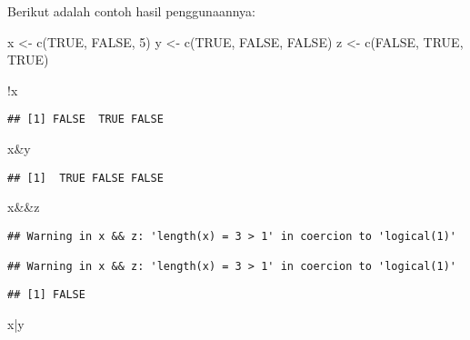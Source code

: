 \documentclass[
]{book}
\newenvironment{Shaded}{\begin{snugshade}}{\end{snugshade}}
\newcommand{\ConstantTok}[1]{\textcolor[rgb]{0.00,0.00,0.00}{#1}}
\newcommand{\DecValTok}[1]{\textcolor[rgb]{0.00,0.00,0.81}{#1}}
\newcommand{\FunctionTok}[1]{\textcolor[rgb]{0.00,0.00,0.00}{#1}}
\newcommand{\NormalTok}[1]{#1}
\newcommand{\OtherTok}[1]{\textcolor[rgb]{0.56,0.35,0.01}{#1}}
\newcommand{\SpecialCharTok}[1]{\textcolor[rgb]{0.00,0.00,0.00}{#1}}
\begin{document}
Berikut adalah contoh hasil penggunaannya:

\begin{Shaded}
\begin{Highlighting}[]
\NormalTok{x }\OtherTok{\textless{}{-}} \FunctionTok{c}\NormalTok{(}\ConstantTok{TRUE}\NormalTok{, }\ConstantTok{FALSE}\NormalTok{, }\DecValTok{5}\NormalTok{)}
\NormalTok{y }\OtherTok{\textless{}{-}} \FunctionTok{c}\NormalTok{(}\ConstantTok{TRUE}\NormalTok{, }\ConstantTok{FALSE}\NormalTok{, }\ConstantTok{FALSE}\NormalTok{)}
\NormalTok{z }\OtherTok{\textless{}{-}} \FunctionTok{c}\NormalTok{(}\ConstantTok{FALSE}\NormalTok{, }\ConstantTok{TRUE}\NormalTok{, }\ConstantTok{TRUE}\NormalTok{)}

\SpecialCharTok{!}\NormalTok{x}
\end{Highlighting}
\end{Shaded}

\begin{verbatim}
## [1] FALSE  TRUE FALSE
\end{verbatim}

\begin{Shaded}
\begin{Highlighting}[]
\NormalTok{x}\SpecialCharTok{\&}\NormalTok{y}
\end{Highlighting}
\end{Shaded}

\begin{verbatim}
## [1]  TRUE FALSE FALSE
\end{verbatim}

\begin{Shaded}
\begin{Highlighting}[]
\NormalTok{x}\SpecialCharTok{\&\&}\NormalTok{z}
\end{Highlighting}
\end{Shaded}

\begin{verbatim}
## Warning in x && z: 'length(x) = 3 > 1' in coercion to 'logical(1)'

## Warning in x && z: 'length(x) = 3 > 1' in coercion to 'logical(1)'
\end{verbatim}

\begin{verbatim}
## [1] FALSE
\end{verbatim}

\begin{Shaded}
\begin{Highlighting}[]
\NormalTok{x}\SpecialCharTok{|}\NormalTok{y}
\end{Highlighting}
\end{Shaded}
\end{document}
